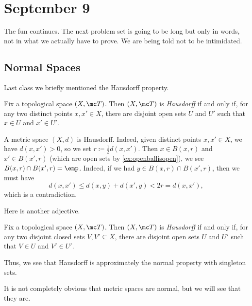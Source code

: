 \documentclass[../notes.tex]{subfiles}
\begin{document}
\section{September 9}

The fun continues. The next problem set is going to be long but only in words, not in what we actually have to prove. We are being told not to be intimidated.

\subsection{Normal Spaces}
Last class we briefly mentioned the Hausdorff property.
\begin{definition}[Hausdroff]
	Fix a topological space $(X,\mc T)$. Then $(X,\mc T)$ is \textit{Hausdorff} if and only if, for any two distinct points $x,x'\in X$, there are disjoint open sets $U$ and $U'$ such that $x\in U$ and $x'\in U'$.
\end{definition}
\begin{example}
	A metric space $(X,d)$ is Hausdorff. Indeed, given distinct points $x,x'\in X$, we have $d(x,x')>0$, so we set $r\coloneqq\frac12d(x,x')$. Then $x\in B(x,r)$ and $x'\in B(x',r)$ (which are open sets by \autoref{ex:openballisopen}), we see $B(x,r)\cap B(x',r)=\emp$. Indeed, if we had $y\in B(x,r)\cap B(x',r)$, then we must have
	\[d(x,x')\le d(x,y)+d(x',y)<2r=d(x,x'),\]
	which is a contradiction.
\end{example}
Here is another adjective.
\begin{definition}[Normal]
	Fix a topological space $(X,\mc T)$. Then $(X,\mc T)$ is \textit{Hausdorff} if and only if, for any two disjoint closed sets $V,V'\subseteq X$, there are disjoint open sets $U$ and $U'$ such that $V\in U$ and $V'\in U'$.
\end{definition}
\begin{remark}
	Thus, we see that Hausdorff is approximately the normal property with singleton sets.
\end{remark}
It is not completely obvious that metric spaces are normal, but we will see that they are.
\end{document}
